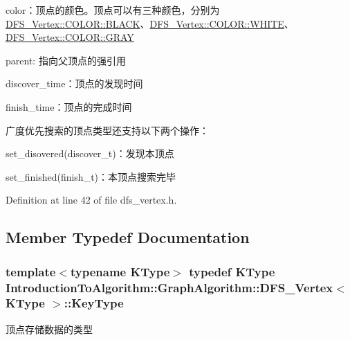 \begin{DoxyItemize}
\item {\ttfamily color}：顶点的颜色。顶点可以有三种颜色，分别为{\ttfamily \hyperlink{struct_introduction_to_algorithm_1_1_graph_algorithm_1_1_d_f_s___vertex_a9455444fdfb1b29f24c1d27e74e7c124a08d0012388564e95c3b4a7407cf04965}{D\+F\+S\+\_\+\+Vertex\+::\+C\+O\+L\+O\+R\+::\+B\+L\+A\+C\+K}}、{\ttfamily \hyperlink{struct_introduction_to_algorithm_1_1_graph_algorithm_1_1_d_f_s___vertex_a9455444fdfb1b29f24c1d27e74e7c124ab5bf627e448384cf3a4c35121ca6008d}{D\+F\+S\+\_\+\+Vertex\+::\+C\+O\+L\+O\+R\+::\+W\+H\+I\+T\+E}}、{\ttfamily \hyperlink{struct_introduction_to_algorithm_1_1_graph_algorithm_1_1_d_f_s___vertex_a9455444fdfb1b29f24c1d27e74e7c124a48bf014c704c9eaae100a98006a37bf7}{D\+F\+S\+\_\+\+Vertex\+::\+C\+O\+L\+O\+R\+::\+G\+R\+A\+Y}}
\item {\ttfamily parent}\+: 指向父顶点的强引用
\item {\ttfamily discover\+\_\+time}：顶点的发现时间
\item {\ttfamily finish\+\_\+time}：顶点的完成时间
\end{DoxyItemize}

广度优先搜索的顶点类型还支持以下两个操作：


\begin{DoxyItemize}
\item {\ttfamily set\+\_\+disovered(discover\+\_\+t)}：发现本顶点
\item {\ttfamily set\+\_\+finished(finish\+\_\+t)}：本顶点搜索完毕 
\end{DoxyItemize}

Definition at line 42 of file dfs\+\_\+vertex.\+h.



\subsection{Member Typedef Documentation}
\hypertarget{struct_introduction_to_algorithm_1_1_graph_algorithm_1_1_d_f_s___vertex_ab53cda3a7d135ed892b298c14d5579fe}{}
\subsubsection[{Key\+Type}]{\setlength{\rightskip}{0pt plus 5cm}template$<$typename K\+Type$>$ typedef K\+Type {\bf Introduction\+To\+Algorithm\+::\+Graph\+Algorithm\+::\+D\+F\+S\+\_\+\+Vertex}$<$ K\+Type $>$\+::{\bf Key\+Type}}\label{struct_introduction_to_algorithm_1_1_graph_algorithm_1_1_d_f_s___vertex_ab53cda3a7d135ed892b298c14d5579fe}
顶点存储数据的类型 

